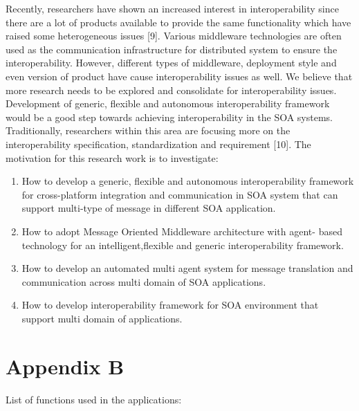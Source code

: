 \documentclass{SureshLimkar}
\begin{document}
\hspace{0.5 in}Recently, researchers have shown an
increased interest in interoperability
since there are a lot of products available
to provide the same functionality which
have raised some heterogeneous issues
[9]. Various middleware technologies
are often used as the communication
infrastructure for distributed system to
ensure the interoperability. However,
different
types
of
middleware,
deployment style and even version of
product have cause interoperability
issues as well. We believe that more
research needs to be explored and
consolidate for interoperability issues.
Development of generic, flexible and
autonomous interoperability framework
would be a good step towards achieving
interoperability in the SOA systems.
Traditionally, researchers within this
area are focusing more on the
interoperability
specification,
standardization and requirement [10].
\hspace{0.5 in}The motivation for this research work is
to investigate:
\begin{enumerate}

\item How to develop a generic, flexible and autonomous interoperability framework for cross-platform integration and communication in SOA system that can support multi-type of message in different SOA application.

\item How to adopt Message Oriented Middleware architecture with agent- based technology for an intelligent,flexible and generic interoperability framework.

\item How to develop an automated multi
agent system for message translation and
communication across multi domain of
SOA applications.

\item How to develop interoperability
framework for SOA environment that
support multi domain of applications.

\end{enumerate}

\chapter{Appendix B}

List of functions used in the applications:
\\
\end{document}
